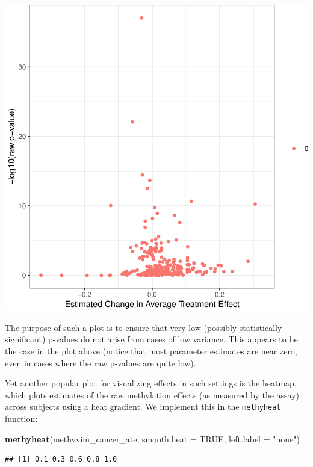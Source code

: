 \documentclass[9pt,a4paper,]{extarticle}
\newenvironment{Shaded}{\begin{snugshade}}{\end{snugshade}}
\newcommand{\DataTypeTok}[1]{\textcolor[rgb]{0.13,0.29,0.53}{#1}}
\newcommand{\KeywordTok}[1]{\textcolor[rgb]{0.13,0.29,0.53}{\textbf{#1}}}
\newcommand{\NormalTok}[1]{#1}
\newcommand{\OtherTok}[1]{\textcolor[rgb]{0.56,0.35,0.01}{#1}}
\newcommand{\StringTok}[1]{\textcolor[rgb]{0.31,0.60,0.02}{#1}}
\theoremstyle{definition}
\theoremstyle{definition}
\theoremstyle{definition}
\theoremstyle{remark}
\begin{document}
\begin{center}\includegraphics{paper_BiocF1000_files/figure-latex/methyvim-volcano-1} \end{center}

The purpose of such a plot is to ensure that very low (possibly statistically
significant) p-values do not arise from cases of low variance. This appears to
be the case in the plot above (notice that most parameter estimates are near
zero, even in cases where the raw p-values are quite low).

Yet another popular plot for visualizing effects in such settings is the
heatmap, which plots estimates of the raw methylation effects (as measured by
the assay) across subjects using a heat gradient. We implement this in the
\texttt{methyheat} function:

\begin{Shaded}
\begin{Highlighting}[]
\KeywordTok{methyheat}\NormalTok{(methyvim_cancer_ate, }\DataTypeTok{smooth.heat =} \OtherTok{TRUE}\NormalTok{, }\DataTypeTok{left.label =} \StringTok{"none"}\NormalTok{)}
\end{Highlighting}
\end{Shaded}

\begin{verbatim}
## [1] 0.1 0.3 0.6 0.8 1.0
\end{verbatim}
\end{document}
